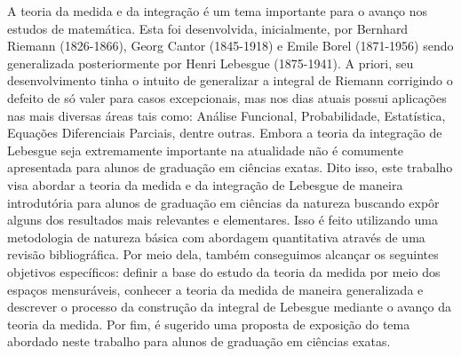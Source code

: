 A teoria da medida e da integração é um tema importante para o avanço nos estudos de matemática.
Esta foi desenvolvida, inicialmente, por Bernhard Riemann (1826-1866), Georg Cantor (1845-1918) e Emile Borel (1871-1956) sendo generalizada posteriormente por Henri Lebesgue
(1875-1941).
A priori, seu desenvolvimento tinha o intuito de generalizar a integral de Riemann corrigindo o defeito de só valer para casos excepcionais, mas nos dias atuais possui aplicações nas mais diversas áreas tais como: Análise Funcional, Probabilidade, Estatística, Equações Diferenciais Parciais, dentre outras. 
Embora a teoria da integração de Lebesgue seja extremamente importante na atualidade não é comumente apresentada para alunos de graduação em ciências exatas.
Dito isso, este trabalho visa abordar a teoria da medida e da integração de Lebesgue de maneira introdutória para alunos de graduação em ciências da natureza buscando expôr alguns dos resultados mais relevantes e elementares.
Isso é feito utilizando uma metodologia de natureza básica com abordagem quantitativa através de uma revisão bibliográfica.
Por meio dela, também conseguimos alcançar os seguintes objetivos específicos: definir a base do estudo da teoria da medida por meio dos espaços mensuráveis,
conhecer a teoria da medida de maneira generalizada e descrever o processo da construção da integral de Lebesgue mediante o avanço da teoria da medida.
Por fim, é sugerido uma proposta de exposição do tema abordado neste trabalho para alunos de graduação em ciências exatas.

